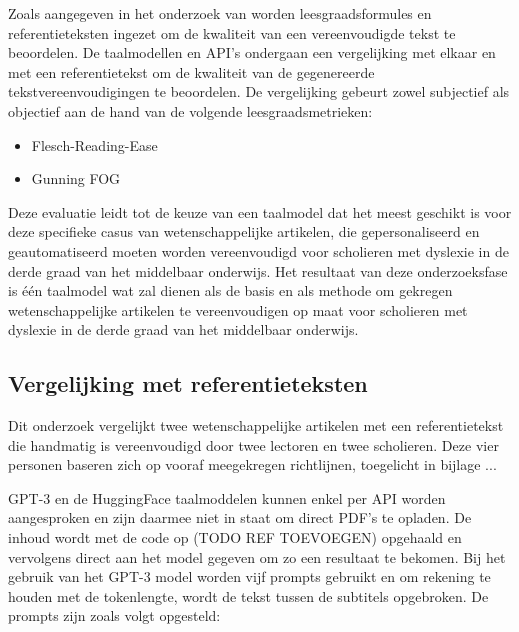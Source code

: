 Zoals aangegeven in het onderzoek van \textcite{Nenkova2004} worden leesgraadsformules en referentieteksten ingezet om de kwaliteit van een vereenvoudigde tekst te beoordelen. De taalmodellen en API's ondergaan een vergelijking met elkaar en met een referentietekst om de kwaliteit van de gegenereerde tekstvereenvoudigingen te beoordelen. De vergelijking gebeurt zowel subjectief als objectief aan de hand van de volgende leesgraadsmetrieken: 

\begin{itemize}
	\item Flesch-Reading-Ease
	\item Gunning FOG
\end{itemize}

Deze evaluatie leidt tot de keuze van een taalmodel dat het meest geschikt is voor deze specifieke casus van wetenschappelijke artikelen, die gepersonaliseerd en geautomatiseerd moeten worden vereenvoudigd voor scholieren met dyslexie in de derde graad van het middelbaar onderwijs. Het resultaat van deze onderzoeksfase is één taalmodel wat zal dienen als de basis en als methode om gekregen wetenschappelijke artikelen te vereenvoudigen op maat voor scholieren met dyslexie in de derde graad van het middelbaar onderwijs.

\subsection{Vergelijking met referentieteksten}

Dit onderzoek vergelijkt twee wetenschappelijke artikelen met een referentietekst die handmatig is vereenvoudigd door twee lectoren en twee scholieren. Deze vier personen baseren zich op vooraf meegekregen richtlijnen, toegelicht in bijlage ...

\medspace

GPT-3 en de HuggingFace taalmoddelen kunnen enkel per API worden aangesproken en zijn daarmee niet in staat om direct PDF's te opladen. De inhoud wordt met de code op (TODO REF TOEVOEGEN) opgehaald en vervolgens direct aan het model gegeven om zo een resultaat te bekomen. Bij het gebruik van het GPT-3 model worden vijf prompts gebruikt en om rekening te houden met de tokenlengte, wordt de tekst tussen de subtitels opgebroken. De prompts zijn zoals volgt opgesteld:

